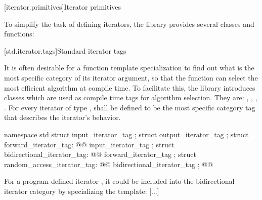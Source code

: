 [iterator.primitives]{Iterator primitives}

\pnum
To simplify the task of defining iterators, the library provides
several classes and functions:

[std.iterator.tags]{Standard iterator tags}

\pnum
{}%
%
%
%
%
%
It is often desirable for a
function template specialization
to find out what is the most specific category of its iterator
argument, so that the function can select the most efficient algorithm at compile time.
To facilitate this, the
library introduces
classes which are used as compile time tags for algorithm selection.
They are:
,
,
,
\newtxt{,}
.
For every iterator of type
,
shall be defined to be the most specific category tag that describes the
iterator's behavior. 

\begin{codeblock}
namespace std {
  struct input_iterator_tag { };
  struct output_iterator_tag { };
  struct forward_iterator_tag: @@ input_iterator_tag { };
  struct bidirectional_iterator_tag: @@ forward_iterator_tag { };
  struct random_access_iterator_tag: @@ bidirectional_iterator_tag { };
  @@
}
\end{codeblock}

\pnum
{}%
%
%
%
%
%
%
\begin{example}
For a program-defined iterator
,
it could be included
into the bidirectional iterator category by specializing the
template:
[...]
\end{example}

